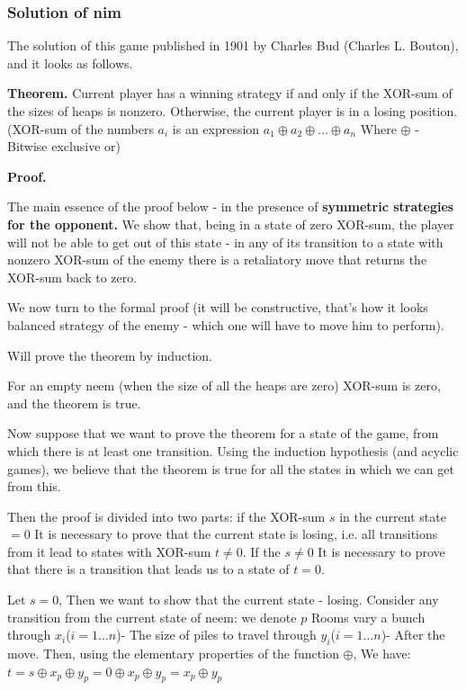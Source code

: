 \subsubsection{ Solution of nim }

The solution of this game published in 1901 by Charles Bud (Charles L. Bouton), and it looks as follows.

\textbf{Theorem.} Current player has a winning strategy if and only if the XOR-sum of the sizes of heaps is nonzero. Otherwise, the current player is in a losing position. (XOR-sum of the numbers $a_i$ is an expression $a_1 \oplus a_2 \oplus \ldots \oplus a_n$ Where $\oplus$ - Bitwise exclusive or)

\textbf{Proof.}

The main essence of the proof below - in the presence of \textbf{symmetric strategies for the opponent.} We show that, being in a state of zero XOR-sum, the player will not be able to get out of this state - in any of its transition to a state with nonzero XOR-sum of the enemy there is a retaliatory move that returns the XOR-sum back to zero.

We now turn to the formal proof (it will be constructive, that's how it looks balanced strategy of the enemy - which one will have to move him to perform).

Will prove the theorem by induction.

For an empty neem (when the size of all the heaps are zero) XOR-sum is zero, and the theorem is true.

Now suppose that we want to prove the theorem for a state of the game, from which there is at least one transition. Using the induction hypothesis (and acyclic games), we believe that the theorem is true for all the states in which we can get from this.

Then the proof is divided into two parts: if the XOR-sum $s$ in the current state $= 0$ It is necessary to prove that the current state is losing, i.e. all transitions from it lead to states with XOR-sum $t \ne 0$. If the $s \ne 0$ It is necessary to prove that there is a transition that leads us to a state of $t = 0$.

Let $s = 0$, Then we want to show that the current state - losing. Consider any transition from the current state of neem: we denote $p$ Rooms vary a bunch through $x_i$($i = 1 \ldots n$)- The size of piles to travel through $y_i$($i = 1 \ldots n$)- After the move. Then, using the elementary properties of the function $\oplus$, We have:
$t=s\oplus x_{p}\oplus y_{p}=0\oplus x_{p}\oplus y_{p}=x_{p}\oplus y_{p}$

